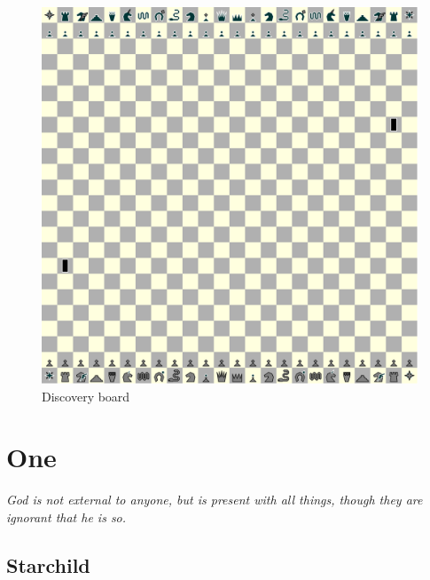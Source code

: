 \documentclass[a5paper,12pt,draft]{book} %
\begin{document}
\noindent
\begin{figure}[h]
\includegraphics[width=1.0\textwidth, keepaspectratio=true]{../gfx/boards/20_discovery.png}
\caption{Discovery board}
\label{fig:discovery}
\end{figure}

\clearpage

\chapter*{One}

\begin{flushright}
\parbox{0.8\textwidth}{
\emph{God is not external to anyone, but is present with all things, though
they are ignorant that he is so. \\
 } }
\end{flushright}

\section*{Starchild}
\end{document}
